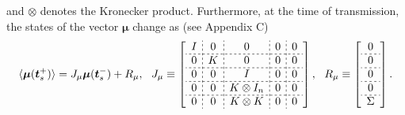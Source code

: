\documentclass[letterpaper, 10 pt,one column, conference]{ieeeconf}  %
\begin{document}
and $\otimes$ denotes the Kronecker product. Furthermore, at the time of transmission, the states of the vector $\boldsymbol\mu$ change as (see Appendix C)
\begin{equation}
\langle \boldsymbol \mu(\boldsymbol{t}_s^+)  \rangle =   J_\mu \boldsymbol \mu(\boldsymbol{t}_s^-) + R_\mu,  \ \ 
J_\mu \equiv    \left[\begin{array}{c;{2pt/2pt}c;{2pt/2pt}c;{2pt/2pt}c;{2pt/2pt}c}
	I & 0 & 0 & 0& 0\\ \hdashline[2pt/2pt]0 &  K & 0 & 0&0 \\ \hdashline[2pt/2pt] 0& 0& I&0& 0  \\ \hdashline[2pt/2pt] 0& 0&  K \otimes I_n &0 & 0\\ \hdashline[2pt/2pt] 0&0&  K \otimes K  &0& 0	\end{array}\right], \ \
R_\mu \equiv  \left[\begin{array}{c}
0\\ \hdashline[2pt/2pt]0\\ \hdashline[2pt/2pt] 0\\ \hdashline[2pt/2pt]0\\ \hdashline[2pt/2pt]\Sigma
\end{array}\right]. \label{reset 2}
\end{equation}
\end{document}
